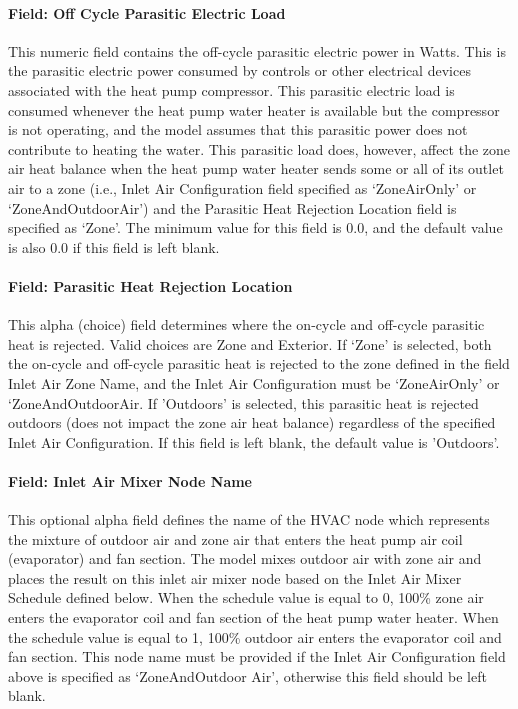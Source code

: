 \paragraph{Field: Off Cycle Parasitic Electric Load}\label{field-off-cycle-parasitic-electric-load-1}

This numeric field contains the off-cycle parasitic electric power in Watts. This is the parasitic electric power consumed by controls or other electrical devices associated with the heat pump compressor. This parasitic electric load is consumed whenever the heat pump water heater is available but the compressor is not operating, and the model assumes that this parasitic power does not contribute to heating the water. This parasitic load does, however, affect the zone air heat balance when the heat pump water heater sends some or all of its outlet air to a zone (i.e., Inlet Air Configuration field specified as `ZoneAirOnly' or `ZoneAndOutdoorAir') and the Parasitic Heat Rejection Location field is specified as `Zone'. The minimum value for this field is 0.0, and the default value is also 0.0 if this field is left blank.

\paragraph{Field: Parasitic Heat Rejection Location}\label{field-parasitic-heat-rejection-location-1}

This alpha (choice) field determines where the on-cycle and off-cycle parasitic heat is rejected. Valid choices are Zone and Exterior. If `Zone' is selected, both the on-cycle and off-cycle parasitic heat is rejected to the zone defined in the field Inlet Air Zone Name, and the Inlet Air Configuration must be `ZoneAirOnly' or `ZoneAndOutdoorAir. If 'Outdoors' is selected, this parasitic heat is rejected outdoors (does not impact the zone air heat balance) regardless of the specified Inlet Air Configuration. If this field is left blank, the default value is 'Outdoors'.

\paragraph{Field: Inlet Air Mixer Node Name}\label{field-inlet-air-mixer-node-name-1}

This optional alpha field defines the name of the HVAC node which represents the mixture of outdoor air and zone air that enters the heat pump air coil (evaporator) and fan section. The model mixes outdoor air with zone air and places the result on this inlet air mixer node based on the Inlet Air Mixer Schedule defined below. When the schedule value is equal to 0, 100\% zone air enters the evaporator coil and fan section of the heat pump water heater. When the schedule value is equal to 1, 100\% outdoor air enters the evaporator coil and fan section. This node name must be provided if the Inlet Air Configuration field above is specified as `ZoneAndOutdoor Air', otherwise this field should be left blank.

